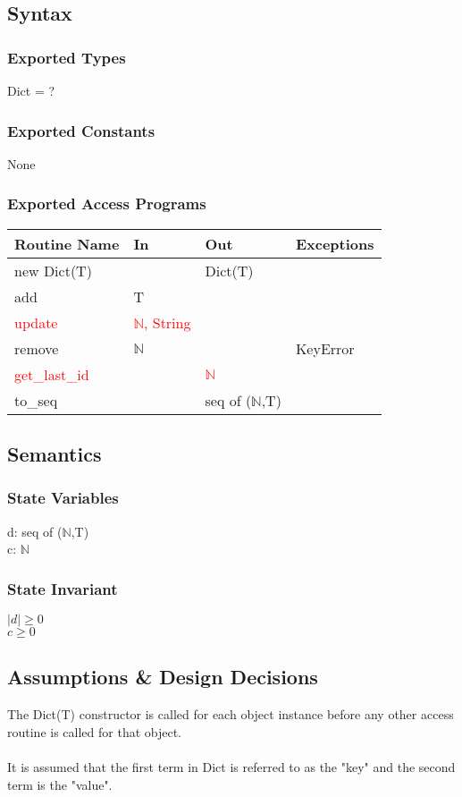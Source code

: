 \documentclass[12pt, titlepage]{article}
\begin{document}
\subsection*{Syntax}
\subsubsection*{Exported Types}
Dict = ?

\subsubsection*{Exported Constants}
None

\subsubsection* {Exported Access Programs}
\begin{tabular}{|p{3cm}|p{3cm}|p{3cm}|p{4.5cm}|}
    \hline
    \textbf{Routine Name} & \textbf{In} & \textbf{Out} & \textbf{Exceptions} \\
    \hline
    new Dict(T) & & Dict(T) &\\
    \hline
    add & T & &\\
    \hline
    \textcolor{red}{update} & \textcolor{red}{$\mathbb{N}$, String} & &\\
    \hline
    remove & $\mathbb{N}$ & & KeyError\\
    \hline
    \textcolor{red}{get\_last\_id} & & \textcolor{red}{$\mathbb{N}$} &\\
    \hline
    to\_seq & & seq of ($\mathbb{N}$,T) & \\
    \hline
\end{tabular}

\subsection*{Semantics}
\subsubsection*{State Variables}
d: seq of ($\mathbb{N}$,T) \\
c: $\mathbb{N}$

\subsubsection*{State Invariant}
$|d| \geq 0$\\
$c \geq 0$

\subsection*{Assumptions \& Design Decisions}
The Dict(T) constructor is called for each object instance before any other access routine is called for that object.\\ \\
It is assumed that the first term in Dict is referred to as the "key" and the second term is the "value".
\end{document}
